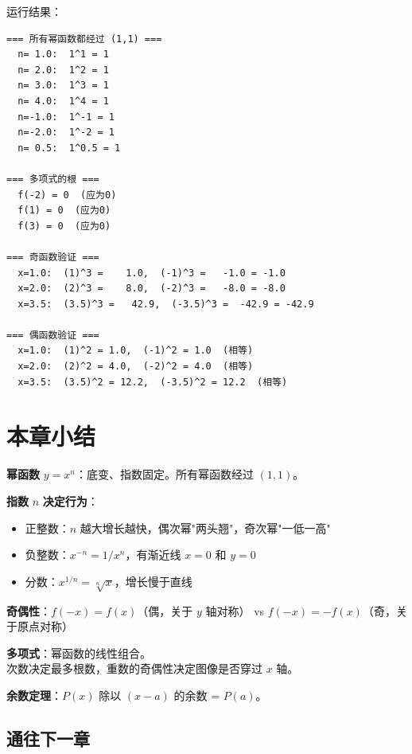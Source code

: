 运行结果：
\begin{lstlisting}[frame=none,backgroundcolor={},numbers=none]
=== 所有幂函数都经过 (1,1) ===
  n= 1.0:  1^1 = 1
  n= 2.0:  1^2 = 1
  n= 3.0:  1^3 = 1
  n= 4.0:  1^4 = 1
  n=-1.0:  1^-1 = 1
  n=-2.0:  1^-2 = 1
  n= 0.5:  1^0.5 = 1

=== 多项式的根 ===
  f(-2) = 0  (应为0)
  f(1) = 0  (应为0)
  f(3) = 0  (应为0)

=== 奇函数验证 ===
  x=1.0:  (1)^3 =    1.0,  (-1)^3 =   -1.0 = -1.0
  x=2.0:  (2)^3 =    8.0,  (-2)^3 =   -8.0 = -8.0
  x=3.5:  (3.5)^3 =   42.9,  (-3.5)^3 =  -42.9 = -42.9

=== 偶函数验证 ===
  x=1.0:  (1)^2 = 1.0,  (-1)^2 = 1.0  (相等)
  x=2.0:  (2)^2 = 4.0,  (-2)^2 = 4.0  (相等)
  x=3.5:  (3.5)^2 = 12.2,  (-3.5)^2 = 12.2  (相等)
\end{lstlisting}


\section{本章小结}

\begin{progressbox}
\textbf{幂函数} \(y = x^n\)：底变、指数固定。所有幂函数经过 \((1,1)\)。

\textbf{指数 }\(n\) \textbf{决定行为}：
\begin{itemize}
  \item 正整数：\(n\) 越大增长越快，偶次幂"两头翘"，奇次幂"一低一高"
  \item 负整数：\(x^{-n} = 1/x^n\)，有渐近线 \(x=0\) 和 \(y=0\)
  \item 分数：\(x^{1/n} = \sqrt[n]{x}\)，增长慢于直线
\end{itemize}

\textbf{奇偶性}：\(f(-x) = f(x)\)（偶，关于 \(y\) 轴对称）
vs \(f(-x) = -f(x)\)（奇，关于原点对称）

\textbf{多项式}：幂函数的线性组合。\\
次数决定最多根数，重数的奇偶性决定图像是否穿过 \(x\) 轴。

\textbf{余数定理}：\(P(x)\) 除以 \((x-a)\) 的余数 = \(P(a)\)。
\end{progressbox}

\subsection*{通往下一章}

